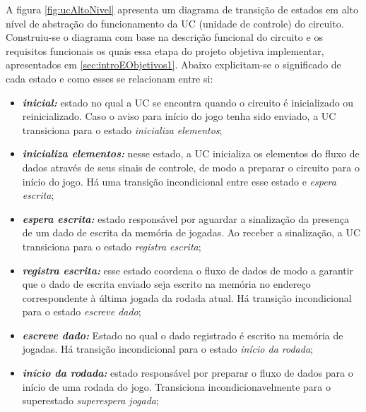 \documentclass[amsmath,amssymb,floatfix]{report}
\begin{document}
A figura \ref{fig:ucAltoNivel} apresenta um diagrama de transição de estados em alto nível de abstração do funcionamento da UC (unidade de controle) do circuito. Construiu-se o diagrama com base na descrição funcional do circuito e os requisitos funcionais os quais essa etapa do projeto objetiva implementar, apresentados em \ref{sec:introEObjetivos1}. Abaixo explicitam-se o significado de cada estado e como esses se relacionam entre si:

\begin{itemize}
    \item \textbf{\textit{inicial:}} estado no qual a UC se encontra quando o circuito é inicializado ou reinicializado. Caso o aviso para início do jogo tenha sido enviado, a UC transiciona para o estado \textit{inicializa elementos};
    \item \textbf{\textit{inicializa elementos:}} nesse estado, a UC inicializa os elementos do fluxo de dados através de seus sinais de controle, de modo a preparar o circuito para o início do jogo. Há uma transição incondicional entre esse estado e \textit{espera escrita};
    \item \textbf{\textit{espera escrita:}} estado responsável por aguardar a sinalização da presença de um dado de escrita da memória de jogadas. Ao receber a sinalização, a UC transiciona para o estado \textit{registra escrita};
    \item \textbf{\textit{registra escrita:}} esse estado coordena o fluxo de dados de modo a garantir que o dado de escrita enviado seja escrito na memória no endereço correspondente à última jogada da rodada atual. Há transição incondicional para o estado \textit{escreve dado};
    \item \textbf{\textit{escreve dado:}} Estado no qual o dado registrado é escrito na memória de jogadas. Há transição incondicional para o estado \textit{início da rodada};
    \item \textbf{\textit{início da rodada:}} estado responsável por preparar o fluxo de dados para o início de uma rodada do jogo. Transiciona incondicionavelmente para o superestado \textit{superespera jogada};

\end{itemize}
\end{document}
